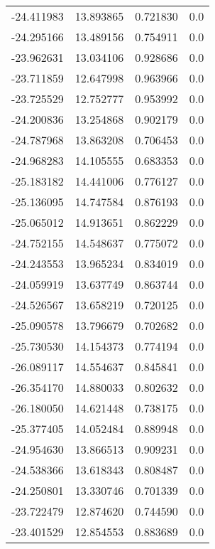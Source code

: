 \begin{tabular}{rrrr}
      -24.411983 &        13.893865 &    0.721830 &   0.0 \\
      -24.295166 &        13.489156 &    0.754911 &   0.0 \\
      -23.962631 &        13.034106 &    0.928686 &   0.0 \\
      -23.711859 &        12.647998 &    0.963966 &   0.0 \\
      -23.725529 &        12.752777 &    0.953992 &   0.0 \\
      -24.200836 &        13.254868 &    0.902179 &   0.0 \\
      -24.787968 &        13.863208 &    0.706453 &   0.0 \\
      -24.968283 &        14.105555 &    0.683353 &   0.0 \\
      -25.183182 &        14.441006 &    0.776127 &   0.0 \\
      -25.136095 &        14.747584 &    0.876193 &   0.0 \\
      -25.065012 &        14.913651 &    0.862229 &   0.0 \\
      -24.752155 &        14.548637 &    0.775072 &   0.0 \\
      -24.243553 &        13.965234 &    0.834019 &   0.0 \\
      -24.059919 &        13.637749 &    0.863744 &   0.0 \\
      -24.526567 &        13.658219 &    0.720125 &   0.0 \\
      -25.090578 &        13.796679 &    0.702682 &   0.0 \\
      -25.730530 &        14.154373 &    0.774194 &   0.0 \\
      -26.089117 &        14.554637 &    0.845841 &   0.0 \\
      -26.354170 &        14.880033 &    0.802632 &   0.0 \\
      -26.180050 &        14.621448 &    0.738175 &   0.0 \\
      -25.377405 &        14.052484 &    0.889948 &   0.0 \\
      -24.954630 &        13.866513 &    0.909231 &   0.0 \\
      -24.538366 &        13.618343 &    0.808487 &   0.0 \\
      -24.250801 &        13.330746 &    0.701339 &   0.0 \\
      -23.722479 &        12.874620 &    0.744590 &   0.0 \\
      -23.401529 &        12.854553 &    0.883689 &   0.0 \\

\end{tabular}
